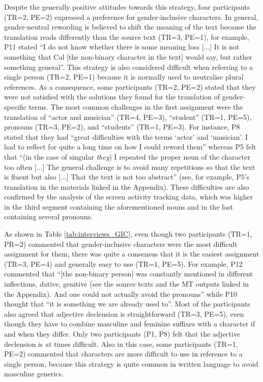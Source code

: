 Despite the generally positive attitudes towards this strategy, four participants (TR=2, PE=2) expressed a preference for gender-inclusive characters. In general, gender-neutral rewording is believed to shift the meaning of the text because the translation reads differently than the source text (TR=3, PE=1), for example, P11 stated ``I do not know whether there is some meaning loss [...] It is not something that Cal [the non-binary character in the text] would say, but rather something general''. This strategy is also considered difficult when referring to a single person (TR=2, PE=1) because it is normally used to neutralise plural references. As a consequence, some participants (TR=2, PE=2) stated that they were not satisfied with the solutions they found for the translation of gender-specific terms. The most common challenges in the first assignment were the translation of ``actor and musician'' (TR=4, PE=3), ``student'' (TR=1, PE=5), pronouns (TR=3, PE=2), and ``students'' (TR=1, PE=3). For instance, P8 stated that they had ``great difficulties with the terms `actor' and `musician'. I had to reflect for quite a long time on how I could reword them'' whereas P5 felt that ``(in the case of singular \textit{they}) I repeated the proper noun of the character too often [...] The general challenge is to avoid many repetitions so that the text is fluent but also [...] That the text is not too abstract'' (see, for example, P5's translation in the materials linked in the Appendix). These difficulties are also confirmed by the analysis of the screen activity tracking data, which was higher in the third segment containing the aforementioned nouns and in the last containing several pronouns.

As shown in Table \ref{tab:interviews_GIC}, even though two participants (TR=1, PR=2) commented that gender-inclusive characters were the most difficult assignment for them, there was quite a consensus that it is the easiest assignment (TR=3, PE=4) and generally easy to use (TR=1, PE=5). For example, P12 commented that ``[the non-binary person] was constantly mentioned in different inflections, dative, genitive (see the source texts and the MT outputs linked in the Appendix). And one could not actually avoid the pronouns'' while P10 thought that ``it is something we are already used to''. Most of the participants also agreed that adjective declension is straightforward (TR=3, PE=5), even though they have to combine masculine and feminine suffixes with a character if and when they differ. Only two participants (P1, P8) felt that the adjective declension is at times difficult. Also in this case, some participants (TR=1, PE=2) commented that characters are more difficult to use in reference to a single person, because this strategy is quite common in written language to avoid masculine generics. 

